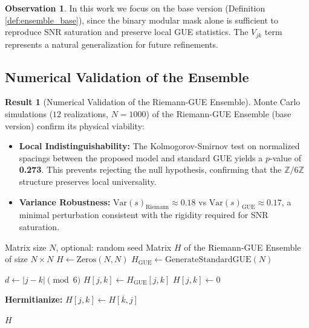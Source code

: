\documentclass[12pt, a4paper]{article}
\theoremstyle{plain}
\theoremstyle{definition}
\newtheorem{observacion}[teorema]{Observation}
\newtheorem{resultado}[teorema]{Result} %
\theoremstyle{remark}
\newcommand{\Z}{\mathbb{Z}}
\begin{document}
\begin{observacion}
In this work we focus on the base version (Definition \ref{def:ensemble_base}), since the binary modular mask alone is sufficient to reproduce SNR saturation and preserve local GUE statistics. The $V_{jk}$ term represents a natural generalization for future refinements.
\end{observacion}

\subsection{Numerical Validation of the Ensemble}
\label{subsec:validacion_ensemble}

\begin{resultado}[Numerical Validation of the Riemann-GUE Ensemble]
Monte Carlo simulations ($12$ realizations, $N=1000$) of the Riemann-GUE Ensemble (base version) confirm its physical viability:
\begin{itemize}
    \item \textbf{Local Indistinguishability:} The Kolmogorov-Smirnov test on normalized spacings between the proposed model and standard GUE yields a $p$-value of \textbf{0.273}. This prevents rejecting the null hypothesis, confirming that the $\Z/6\Z$ structure preserves local universality.
    \item \textbf{Variance Robustness:} $\text{Var}(s)_{\text{Riemann}} \approx 0.18$ vs $\text{Var}(s)_{\text{GUE}} \approx 0.17$, a minimal perturbation consistent with the rigidity required for SNR saturation.
\end{itemize}
\end{resultado}

\begin{algorithm}[H]
\caption{Generation of the Riemann-GUE Ensemble (Base Version)}
\label{alg:riemann_gue}
\begin{algorithmic}[1]
\Require Matrix size $N$, optional: random seed
\Ensure Matrix $H$ of the Riemann-GUE Ensemble of size $N \times N$
    \State $H \gets \text{Zeros}(N, N)$ 
    \State $H_{\text{GUE}} \gets \text{GenerateStandardGUE}(N)$ 
    
         
            \State $d \gets |j - k| \pmod 6$ 
             
                \State $H[j, k] \gets H_{\text{GUE}}[j, k]$ 
            \Else
                \State $H[j, k] \gets 0$ 
            \EndIf
        \EndFor
    \EndFor
    
    \State \textbf{Hermitianize:} 
            \State $H[j, k] \gets \overline{H[k, j]}$ 
        \EndFor
    \EndFor
    
    \State \Return $H$
\EndFunction
\end{algorithmic}
\end{algorithm}
\end{document}
